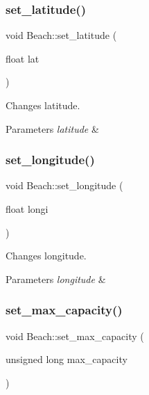 \subsubsection{\texorpdfstring{set\+\_\+latitude()}{set\_latitude()}}
{\footnotesize\ttfamily void Beach\+::set\+\_\+latitude (\begin{DoxyParamCaption}\item[{float}]{lat }\end{DoxyParamCaption})}



Changes latitude. 


\begin{DoxyParams}{Parameters}
{\em latitude} & \\
\hline
\end{DoxyParams}
\mbox{\label{class_beach_af846ce1aabbd67742a4fef8fa64dcec8}} 
\subsubsection{\texorpdfstring{set\+\_\+longitude()}{set\_longitude()}}
{\footnotesize\ttfamily void Beach\+::set\+\_\+longitude (\begin{DoxyParamCaption}\item[{float}]{longi }\end{DoxyParamCaption})}



Changes longitude. 


\begin{DoxyParams}{Parameters}
{\em longitude} & \\
\hline
\end{DoxyParams}
\mbox{\label{class_beach_a952a4e75dd1e8200c6cc0bfde8728789}} 
\subsubsection{\texorpdfstring{set\+\_\+max\+\_\+capacity()}{set\_max\_capacity()}}
{\footnotesize\ttfamily void Beach\+::set\+\_\+max\+\_\+capacity (\begin{DoxyParamCaption}\item[{unsigned long}]{max\+\_\+capacity }\end{DoxyParamCaption})}



